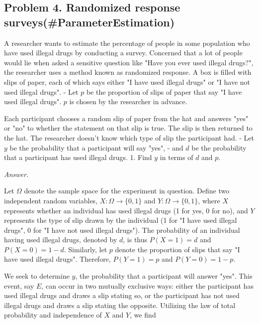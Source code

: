 \documentclass[12pt]{article}
\begin{document}
\newpage
\subsection*{\huge Problem 4. Randomized response surveys(\#ParameterEstimation) }

\begin{q}
A researcher wants to estimate the percentage of people in some population who have used illegal drugs by conducting a survey. Concerned that a lot of people would lie when asked a sensitive question like "Have you ever used illegal drugs?", the researcher uses a method known as randomized response. A box is filled with slips of paper, each of which says either "I have used illegal drugs" or "I have not used illegal drugs".
- Let \(p\) be the proportion of slips of paper that say "I have used illegal drugs". \(p\) is chosen by the researcher in advance.

Each participant chooses a random slip of paper from the hat and answers "yes" or "no" to whether the statement on that slip is true. The slip is then returned to the hat. The researcher doesn't know which type of slip the participant had.
- Let \(y\) be the probability that a participant will say "yes",
- and \(d\) be the probability that a participant has used illegal drugs.
1. Find \(y\) in terms of \(d\) and \(p\).
\end{q}
\textit{Answer.}

Let \( \Omega \) denote the sample space for the experiment in question. Define two independent random variables, \( X: \Omega \rightarrow \{0, 1\} \) and \( Y: \Omega \rightarrow \{0, 1\} \), where \( X \) represents whether an individual has used illegal drugs (1 for yes, 0 for no), and \( Y \) represents the type of slip drawn by the individual (1 for "I have used illegal drugs", 0 for "I have not used illegal drugs"). The probability of an individual having used illegal drugs, denoted by \( d \), is thus \( P(X = 1) = d \) and \( P(X = 0) = 1 - d \). Similarly, let \( p \) denote the proportion of slips that say "I have used illegal drugs". Therefore, \( P(Y = 1) = p \) and \( P(Y = 0) = 1 - p \).

We seek to determine \( y \), the probability that a participant will answer "yes". This event, say \( E \), can occur in two mutually exclusive ways: either the participant has used illegal drugs and draws a slip stating so, or the participant has not used illegal drugs and draws a slip stating the opposite. Utilizing the law of total probability and independence of \( X \) and \( Y \), we find
\end{document}
